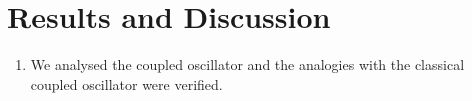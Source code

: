 \chapter{\label{results}Results and Discussion}
\begin{enumerate}
	\item We analysed the coupled oscillator and the analogies with the classical coupled oscillator were verified. 
\end{enumerate}
\setcounter{equation}{0}
\setcounter{table}{0}
\setcounter{figure}{0}


    



